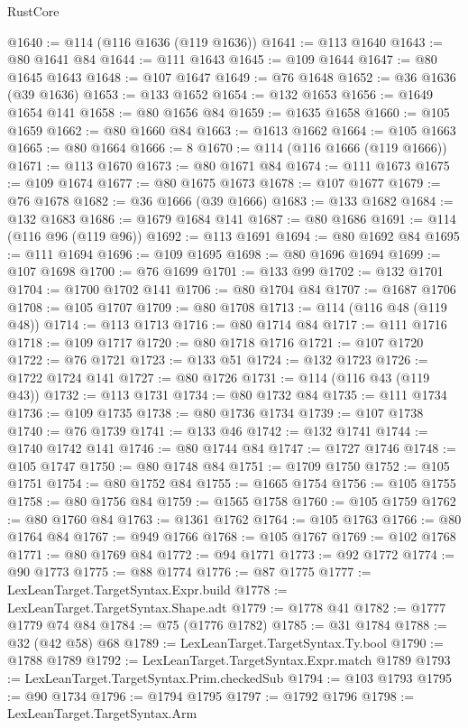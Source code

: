 \begin{lexlean}{RustCore}
\begin{coremodule}
@1640 := @114 (@116 @1636 (@119 @1636))
@1641 := @113 @1640
@1643 := @80 @1641 @84
@1644 := @111 @1643
@1645 := @109 @1644
@1647 := @80 @1645 @1643
@1648 := @107 @1647
@1649 := @76 @1648
@1652 := @36 @1636 (@39 @1636)
@1653 := @133 @1652
@1654 := @132 @1653
@1656 := @1649 @1654 @141
@1658 := @80 @1656 @84
@1659 := @1635 @1658
@1660 := @105 @1659
@1662 := @80 @1660 @84
@1663 := @1613 @1662
@1664 := @105 @1663
@1665 := @80 @1664
@1666 := 8
@1670 := @114 (@116 @1666 (@119 @1666))
@1671 := @113 @1670
@1673 := @80 @1671 @84
@1674 := @111 @1673
@1675 := @109 @1674
@1677 := @80 @1675 @1673
@1678 := @107 @1677
@1679 := @76 @1678
@1682 := @36 @1666 (@39 @1666)
@1683 := @133 @1682
@1684 := @132 @1683
@1686 := @1679 @1684 @141
@1687 := @80 @1686
@1691 := @114 (@116 @96 (@119 @96))
@1692 := @113 @1691
@1694 := @80 @1692 @84
@1695 := @111 @1694
@1696 := @109 @1695
@1698 := @80 @1696 @1694
@1699 := @107 @1698
@1700 := @76 @1699
@1701 := @133 @99
@1702 := @132 @1701
@1704 := @1700 @1702 @141
@1706 := @80 @1704 @84
@1707 := @1687 @1706
@1708 := @105 @1707
@1709 := @80 @1708
@1713 := @114 (@116 @48 (@119 @48))
@1714 := @113 @1713
@1716 := @80 @1714 @84
@1717 := @111 @1716
@1718 := @109 @1717
@1720 := @80 @1718 @1716
@1721 := @107 @1720
@1722 := @76 @1721
@1723 := @133 @51
@1724 := @132 @1723
@1726 := @1722 @1724 @141
@1727 := @80 @1726
@1731 := @114 (@116 @43 (@119 @43))
@1732 := @113 @1731
@1734 := @80 @1732 @84
@1735 := @111 @1734
@1736 := @109 @1735
@1738 := @80 @1736 @1734
@1739 := @107 @1738
@1740 := @76 @1739
@1741 := @133 @46
@1742 := @132 @1741
@1744 := @1740 @1742 @141
@1746 := @80 @1744 @84
@1747 := @1727 @1746
@1748 := @105 @1747
@1750 := @80 @1748 @84
@1751 := @1709 @1750
@1752 := @105 @1751
@1754 := @80 @1752 @84
@1755 := @1665 @1754
@1756 := @105 @1755
@1758 := @80 @1756 @84
@1759 := @1565 @1758
@1760 := @105 @1759
@1762 := @80 @1760 @84
@1763 := @1361 @1762
@1764 := @105 @1763
@1766 := @80 @1764 @84
@1767 := @949 @1766
@1768 := @105 @1767
@1769 := @102 @1768
@1771 := @80 @1769 @84
@1772 := @94 @1771
@1773 := @92 @1772
@1774 := @90 @1773
@1775 := @88 @1774
@1776 := @87 @1775
@1777 := LexLeanTarget.TargetSyntax.Expr.build
@1778 := LexLeanTarget.TargetSyntax.Shape.adt
@1779 := @1778 @41
@1782 := @1777 @1779 @74 @84
@1784 := @75 (@1776 @1782)
@1785 := @31 @1784
@1788 := @32 (@42 @58) @68
@1789 := LexLeanTarget.TargetSyntax.Ty.bool
@1790 := @1788 @1789
@1792 := LexLeanTarget.TargetSyntax.Expr.match @1789
@1793 := LexLeanTarget.TargetSyntax.Prim.checkedSub
@1794 := @103 @1793
@1795 := @90 @1734
@1796 := @1794 @1795
@1797 := @1792 @1796
@1798 := LexLeanTarget.TargetSyntax.Arm

\end{coremodule}
\end{lexlean}
